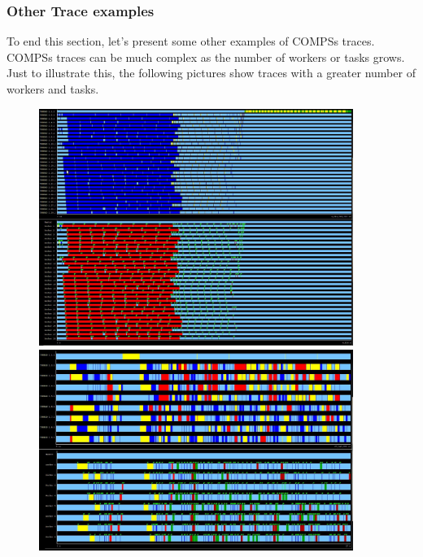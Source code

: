 \subsubsection{Other Trace examples}

To end this section, let’s present some other examples of COMPSs traces. COMPSs traces can be 
much complex as the number of workers or tasks grows. Just to illustrate this, the following 
pictures show traces with a greater number of workers and tasks.

\begin{figure}[ht!]
  \centering
    \includegraphics[width=0.91\textwidth]{./Sections/7_Tracing/Figures/16.jpeg}
    \includegraphics[width=0.91\textwidth]{./Sections/7_Tracing/Figures/16_2.jpeg}
\end{figure}

